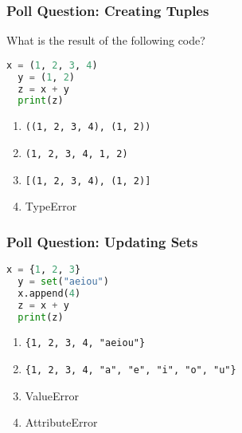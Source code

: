 \documentclass[xcolor=table]{beamer}
\begin{document}
%
%
\begin{frame}[fragile]
  \frametitle{Poll Question: Creating Tuples} 
  What is the result of the following code?
  \begin{lstlisting}[language=Python, autogobble]
  x = (1, 2, 3, 4)
  y = (1, 2)
  z = x + y
  print(z)
  \end{lstlisting}
  \vfill
  \begin{enumerate}[A] 
    \item \lstinline|((1, 2, 3, 4), (1, 2))|
    \item \lstinline|(1, 2, 3, 4, 1, 2)|
    \item \lstinline|[(1, 2, 3, 4), (1, 2)]|
    \item TypeError
  \end{enumerate}
\end{frame}

%
%
\begin{frame}[fragile]
  \frametitle{Poll Question: Updating Sets}
  \begin{lstlisting}[language=Python, autogobble]
  x = {1, 2, 3}
  y = set("aeiou")
  x.append(4)
  z = x + y
  print(z)
  \end{lstlisting}
  \vfill
  \begin{enumerate}[A] 
    \item \lstinline|{1, 2, 3, 4, "aeiou"}|
    \item \lstinline|{1, 2, 3, 4, "a", "e", "i", "o", "u"}|
    \item ValueError
    \item AttributeError
  \end{enumerate}
\end{frame}
\end{document}
